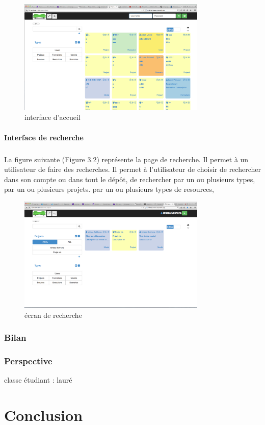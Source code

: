 \documentclass{report}
\begin{document}
\begin{figure}[h!]
     \centering
     \includegraphics[width=0.8\textwidth] {img/1-ecran-create-user}
     \caption{interface d'accueil}
\end{figure}

\subsubsection{Interface de recherche}

\paragraph{}
La figure suivante (Figure 3.2) représente la page de recherche. Il permet à un utilisateur de faire des recherches.
Il permet à l'utilisateur de choisir de rechercher dans son compte ou dans tout le dépôt, de rechercher par un ou
plusieurs types, par un ou plusieurs projets.
 par
un ou plusieurs types de resources, 

\newpage

\begin{figure}[h!]
     \centering
     \includegraphics[width=0.8\textwidth] {img/1-ecran-recherche}
     \caption{écran de recherche}
\end{figure}







\subsection{Bilan}
\subsection{Perspective}
classe étudiant : lauré
\chapter*{Conclusion}

\paragraph{}
\end{document}
